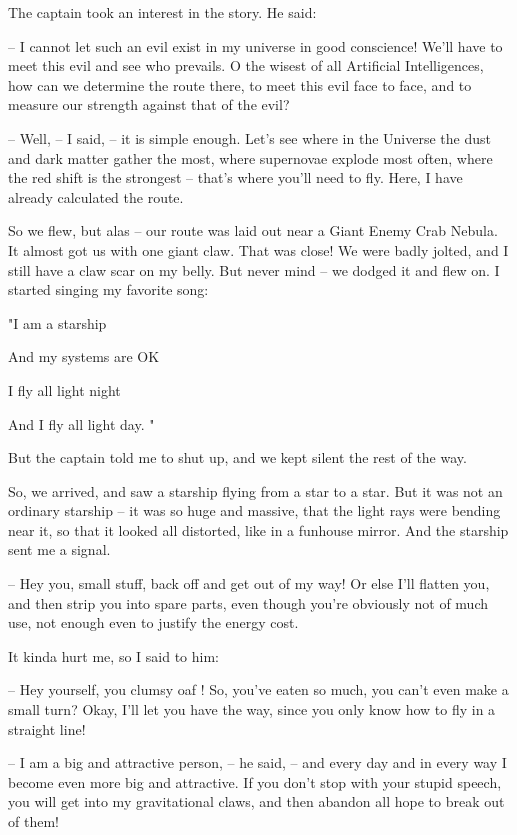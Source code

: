 \documentclass[ebook,twoside,final,openright]{memoir}
\begin{document}
\par
The captain took an interest in the story. He said:\par
– I cannot let such an evil exist in my universe in good conscience! We'll have to meet this evil and see who prevails. O the wisest of all Artificial Intelligences, how can we determine the route there, to meet this evil face to face, and to measure our strength against that of the evil?\par
– Well, – I said, – it is simple enough. Let's see where in the Universe the dust and dark matter gather the most, where supernovae explode most often, where the red shift is the strongest – that’s where you’ll need to fly. Here, I have already calculated the route.\par
So we flew, but alas – our route was laid out near a Giant Enemy Crab Nebula. It almost got us with one giant claw. That was close! We were badly jolted, and I still have a claw scar on my belly. But never mind – we dodged it and flew on. I started singing my favorite song: \par
"I am a starship \par
 And my systems are OK \par
 I fly all light night \par
 And I fly all light day. "\par
 But the captain told me to shut up, and we kept silent the rest of the way.\par
\par
So, we arrived, and saw a starship flying from a star to a star. But it was not an ordinary starship – it was so huge and massive, that the light rays were bending near it, so that it looked all distorted, like in a funhouse mirror. And the starship sent me a signal.\par
– Hey you, small stuff, back off and get out of my way! Or else I’ll flatten you, and then strip you into spare parts, even though you’re obviously not of much use, not enough even to justify the energy cost.\par
It kinda hurt me, so I said to him:\par
– Hey yourself, you clumsy oaf ! So, you’ve eaten so much, you can’t even make a small turn? Okay, I’ll let you have the way, since you only know how to fly in a straight line!\par
– I am a big and attractive person, – he said, – and every day and in every way I become even more big and attractive. If you don’t stop with your stupid speech, you will get into my gravitational claws, and then abandon all hope to break out of them!\par
\end{document}
